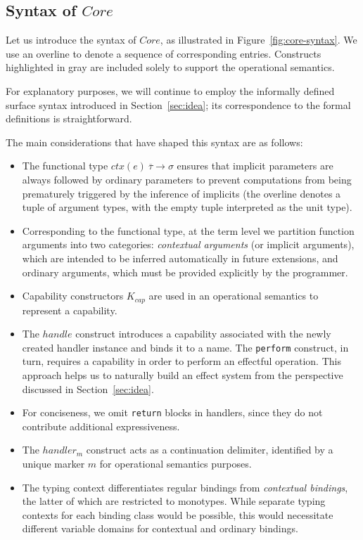 \documentclass[acmsmall,review,screen]{acmart}
\newcommand{\ctx}[1]{ctx\left(#1\right)~}
\begin{document}
\subsection{Syntax of $Core$} \label{subsec:syntax-core}

Let us introduce the syntax of $Core$, as illustrated in Figure~\ref{fig:core-syntax}.
We use an overline to denote a sequence of corresponding entries.
Constructs highlighted in gray are included solely to support the operational semantics.

For explanatory purposes, we will continue to employ the informally defined surface syntax introduced in Section~\ref{sec:idea}; its correspondence to the formal definitions is straightforward.

The main considerations that have shaped this syntax are as follows:
\begin{itemize}
    \item The functional type $\ctx{e}\overline{\tau}\to\sigma$ ensures that implicit parameters are always followed by ordinary parameters to prevent computations from being prematurely triggered by the inference of implicits (the overline denotes a tuple of argument types, with the empty tuple interpreted as the unit type).
    \item Corresponding to the functional type, at the term level we partition function arguments into two categories: \emph{contextual arguments} (or implicit arguments), which are intended to be inferred automatically in future extensions, and ordinary arguments, which must be provided explicitly by the programmer.
    \item Capability constructors $K_{cap}$ are used in an operational semantics to represent a capability.
    \item  The $handle$ construct introduces a capability associated with the newly created handler instance and binds it to a name.
    The \texttt{perform} construct, in turn, requires a capability in order to perform an effectful operation.
    This approach helps us to naturally build an effect system from the perspective discussed in Section~\ref{sec:idea}.
    \item For conciseness, we omit \texttt{return} blocks in handlers, since they do not contribute additional expressiveness.
    \item The $handler_m$ construct acts as a continuation delimiter, identified by a unique marker $m$ for operational semantics purposes.
    \item The typing context differentiates regular bindings from \emph{contextual bindings}, the latter of which are restricted to monotypes.
    While separate typing contexts for each binding class would be possible, this would necessitate different variable domains for contextual and ordinary bindings.
\end{itemize}
\end{document}
